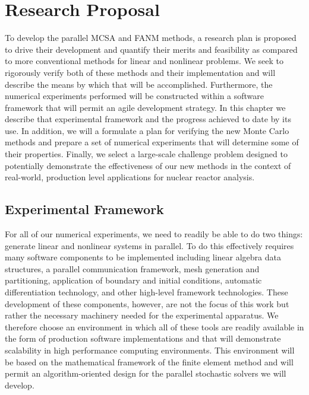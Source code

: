 \chapter{Research Proposal}
\label{ch:research_proposal}
To develop the parallel MCSA and FANM methods, a research plan is
proposed to drive their development and quantify their merits and
feasibility as compared to more conventional methods for linear and
nonlinear problems. We seek to rigorously verify both of these methods
and their implementation and will describe the means by which that
will be accomplished. Furthermore, the numerical experiments performed
will be constructed within a software framework that will permit an
agile development strategy. In this chapter we describe that
experimental framework and the progress achieved to date by its
use. In addition, we will a formulate a plan for verifying the new
Monte Carlo methods and prepare a set of numerical experiments that
will determine some of their properties. Finally, we select a
large-scale challenge problem designed to potentially demonstrate the
effectiveness of our new methods in the context of real-world,
production level applications for nuclear reactor analysis.

\section{Experimental Framework}
\label{sec:experimental_framework}
For all of our numerical experiments, we need to readily be able to do
two things: generate linear and nonlinear systems in parallel. To do
this effectively requires many software components to be implemented
including linear algebra data structures, a parallel communication
framework, mesh generation and partitioning, application of boundary
and initial conditions, automatic differentiation technology, and
other high-level framework technologies. These development of these
components, however, are not the focus of this work but rather the
necessary machinery needed for the experimental apparatus. We
therefore choose an environment in which all of these tools are
readily available in the form of production software implementations
and that will demonstrate scalability in high performance computing
environments. This environment will be based on the mathematical
framework of the finite element method and will permit an
algorithm-oriented design for the parallel stochastic solvers we will
develop.

